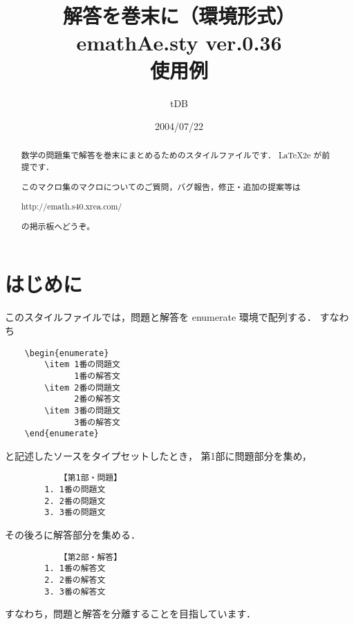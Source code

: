 \documentclass{jarticle}
\begin{document}
\title{解答を巻末に（環境形式）\\
emathAe.sty {\normalsize ver.0.36}\\使用例}
\author{tDB}
\date{2004/07/22}

\maketitle\thispagestyle{empty}
\begin{abstract}%
\zw%
数学の問題集で解答を巻末にまとめるためのスタイルファイルです．
\LaTeX2e が前提です．

このマクロ集のマクロについてのご質問，バグ報告，修正・追加の提案等は
\begin{center}
http://emath.s40.xrea.com/
\end{center}
の掲示板へどうぞ。
\end{abstract}

\tableofcontents

\pagebreak

\section{はじめに}
このスタイルファイルでは，問題と解答を \textsf{enumerate} 環境で配列する．
すなわち
\begin{screen}
\begin{jquote}
\begin{verbatim}
    \begin{enumerate}
        \item 1番の問題文
              1番の解答文
        \item 2番の問題文
              2番の解答文
        \item 3番の問題文
              3番の解答文
    \end{enumerate}
\end{verbatim}
\end{jquote}
\end{screen}
と記述したソースをタイプセットしたとき，
第1部に問題部分を集め，
\begin{shadebox}
\begin{jquote}
\begin{verbatim}
           【第1部・問題】
        1. 1番の問題文
        2. 2番の問題文
        3. 3番の問題文
\end{verbatim}
\end{jquote}
\end{shadebox}
その後ろに解答部分を集める．
\begin{shadebox}
\begin{jquote}
\begin{verbatim}
           【第2部・解答】
        1. 1番の解答文
        2. 2番の解答文
        3. 3番の解答文
\end{verbatim}
\end{jquote}
\end{shadebox}
すなわち，問題と解答を分離することを目指しています．
\end{document}
